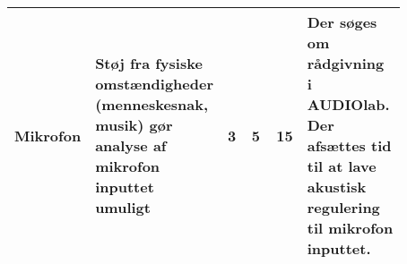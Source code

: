 \begin{landscape}
\begin{table}[]
\begin{tabular}{
p{0.1\linewidth} %
p{0.25\linewidth} %
p{0.08\linewidth} %
p{0.09\linewidth} %
p{0.05\linewidth} %
p{0.3\linewidth} %
}
Mikrofon         & Støj fra fysiske omstændigheder   (menneskesnak, musik) gør analyse af mikrofon inputtet umuligt                                             & 3           & 5           & 15     & Der søges om rådgivning i   AUDIOlab. Der afsættes tid til at lave akustisk regulering til mikrofon   inputtet.            \\\bottomrule                                                 
\end{tabular}
\end{table}
\end{landscape}